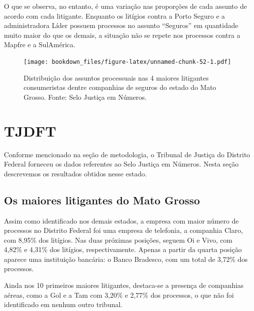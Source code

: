 \documentclass[]{report}
\begin{document}
O que se observa, no entanto, é uma variação nas proporções de cada
assunto de acordo com cada litigante. Enquanto os litígios contra a
Porto Seguro e a administradora Líder possuem processos no assunto
``Seguros'' em quantidade muito maior do que os demais, a situação não
se repete nos processos contra a Mapfre e a SulAmérica.

\begin{figure}[htbp]
\centering
\texttt{[image: bookdown\_files/figure-latex/unnamed-chunk-52-1.pdf]}
\caption{\label{fig:unnamed-chunk-52}Distribuição dos assuntos processuais
nas 4 maiores litigantes consumeristas dentre companhias de seguros do
estado do Mato Grosso. Fonte: Selo Justiça em Números.}
\end{figure}

\section{TJDFT}\label{tjdft}

Conforme mencionado na seção de metodologia, o Tribunal de Justiça do
Distrito Federal forneceu os dados referentes ao Selo Justiça em
Números. Nesta seção descrevemos os resultados obtidos nesse estado.

\subsection{Os maiores litigantes do Mato
Grosso}\label{os-maiores-litigantes-do-mato-grosso-1}

Assim como identificado nos demais estados, a empresa com maior número
de processos no Distrito Federal foi uma empresa de telefonia, a
companhia Claro, com 8,95\% dos litígios. Nas duas próximas posições,
seguem Oi e Vivo, com 4,82\% e 4,31\% dos litígios, respectivamente.
Apenas a partir da quarta posição aparece uma instituição bancária: o
Banco Bradesco, com um total de 3,72\% dos processos.

Ainda nos 10 primeiros maiores litigantes, destaca-se a presença de
companhias aéreas, como a Gol e a Tam com 3,20\% e 2,77\% dos processos,
o que não foi identificado em nenhum outro tribunal.
\end{document}
